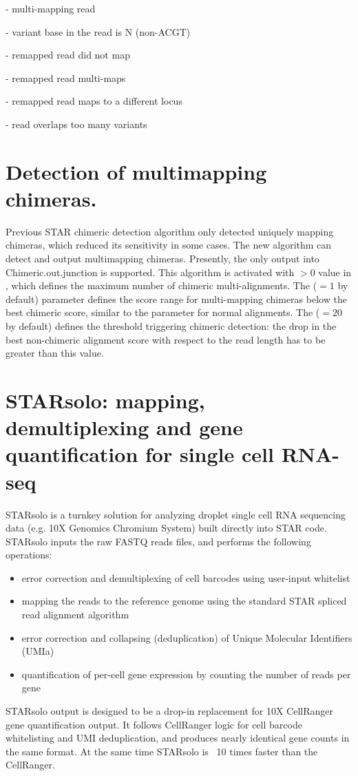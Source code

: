 \documentclass[12pt]{article}
\begin{document}
 - multi-mapping read

 - variant base in the read is N (non-ACGT)

 - remapped read did not map

 - remapped read multi-maps

 - remapped read maps to a different locus

 - read overlaps too many variants

\section{Detection of multimapping chimeras.}
Previous STAR chimeric detection algorithm only detected uniquely mapping chimeras, which reduced its sensitivity in some cases.
The new algorithm can detect and output multimapping chimeras. Presently, the only output into Chimeric.out.junction is supported.
This algorithm is activated with $>0$ value in , which defines the maximum number of chimeric multi-alignments.
The  ($=1$ by default) parameter defines the score range for multi-mapping chimeras below the best chimeric score, similar to the  parameter for normal alignments.
The  ($=20$ by default) defines the threshold triggering chimeric detection: the drop in the best non-chimeric alignment score with respect to the read length has to be greater than this value.

\section{STARsolo: mapping, demultiplexing and gene quantification for single cell RNA-seq}

STARsolo is a turnkey solution for analyzing droplet single cell RNA sequencing data (e.g. 10X Genomics Chromium System) built directly into STAR code.
STARsolo inputs the raw FASTQ reads files, and performs the following operations:
\begin{itemize}
	\itemsep -0.5em
	\item 
	error correction and demultiplexing of cell barcodes using user-input whitelist
	\item 
	mapping the reads to the reference genome using the standard STAR spliced read alignment algorithm
	\item
	error correction and collapsing (deduplication) of Unique Molecular Identifiers (UMIa)
	\item
	quantification of per-cell gene expression by counting the number of reads per gene
\end{itemize}
STARsolo output is designed to be a drop-in replacement for 10X CellRanger gene quantification output.
It follows CellRanger logic for cell barcode whitelisting and UMI deduplication, and produces nearly identical gene counts in the same format. At the same time STARsolo is ~10 times faster than the CellRanger.
\end{document}
